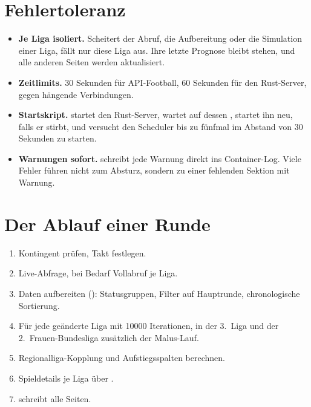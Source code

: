 \section{Fehlertoleranz}

\begin{itemize}
  \item \textbf{Je Liga isoliert.} Scheitert der Abruf, die Aufbereitung oder
        die Simulation einer Liga, fällt nur diese Liga aus. Ihre letzte
        Prognose bleibt stehen, und alle anderen Seiten werden aktualisiert.
  \item \textbf{Zeitlimits.} 30 Sekunden für API-Football, 60 Sekunden für den
        Rust-Server, gegen hängende Verbindungen.
  \item \textbf{Startskript.}  startet den Rust-Server,
        wartet auf dessen , startet ihn neu, falls er stirbt,
        und versucht den Scheduler bis zu fünfmal im Abstand von 30 Sekunden
        zu starten.
  \item \textbf{Warnungen sofort.}  schreibt jede
        Warnung direkt ins Container-Log. Viele Fehler führen nicht zum
        Absturz, sondern zu einer fehlenden Sektion mit Warnung.
\end{itemize}

\section{Der Ablauf einer Runde}

\begin{enumerate}
  \item Kontingent prüfen, Takt festlegen.
  \item Live-Abfrage, bei Bedarf Vollabruf je Liga.
  \item Daten aufbereiten (): Statusgruppen, Filter auf
        Hauptrunde, chronologische Sortierung.
  \item Für jede geänderte Liga  mit \num{10000}
        Iterationen, in der 3.~Liga und der 2.~Frauen-Bundesliga zusätzlich
        der Malus-Lauf.
  \item Regionalliga-Kopplung und Aufstiegsspalten berechnen.
  \item Spieldetails je Liga über .
  \item {} schreibt alle Seiten.
\end{enumerate}
